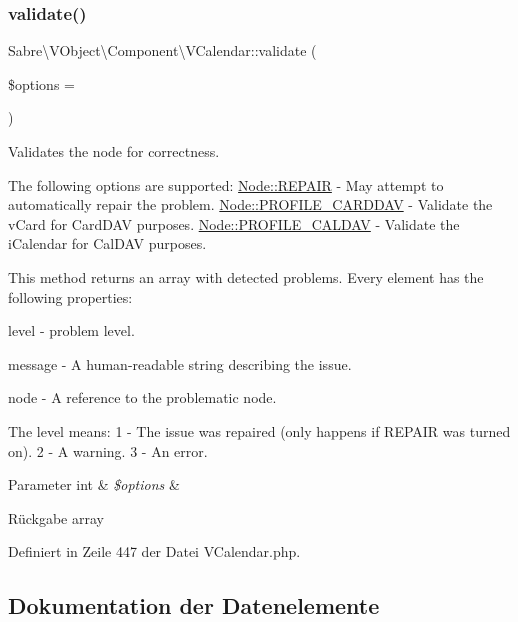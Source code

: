 \subsubsection{\texorpdfstring{validate()}{validate()}}
{\footnotesize\ttfamily Sabre\textbackslash{}\+V\+Object\textbackslash{}\+Component\textbackslash{}\+V\+Calendar\+::validate (\begin{DoxyParamCaption}\item[{}]{\$options = {} }\end{DoxyParamCaption})}

Validates the node for correctness.

The following options are supported\+: \mbox{\hyperlink{class_sabre_1_1_v_object_1_1_node_ac97a7fb85c1f871523336cd1ec6b29a9}{Node\+::\+R\+E\+P\+A\+IR}} -\/ May attempt to automatically repair the problem. \mbox{\hyperlink{class_sabre_1_1_v_object_1_1_node_a0aac3de0b04bcc44bbf0e22ae47a51c3}{Node\+::\+P\+R\+O\+F\+I\+L\+E\+\_\+\+C\+A\+R\+D\+D\+AV}} -\/ Validate the v\+Card for Card\+D\+AV purposes. \mbox{\hyperlink{class_sabre_1_1_v_object_1_1_node_a1e68f819b7b5537929290e061ffeacc5}{Node\+::\+P\+R\+O\+F\+I\+L\+E\+\_\+\+C\+A\+L\+D\+AV}} -\/ Validate the i\+Calendar for Cal\+D\+AV purposes.

This method returns an array with detected problems. Every element has the following properties\+:


\begin{DoxyItemize}
\item level -\/ problem level.
\item message -\/ A human-\/readable string describing the issue.
\item node -\/ A reference to the problematic node.
\end{DoxyItemize}

The level means\+: 1 -\/ The issue was repaired (only happens if R\+E\+P\+A\+IR was turned on). 2 -\/ A warning. 3 -\/ An error.


\begin{DoxyParams}[1]{Parameter}
int & {\em \$options} & \\
\hline
\end{DoxyParams}
\begin{DoxyReturn}{Rückgabe}
array 
\end{DoxyReturn}


Definiert in Zeile 447 der Datei V\+Calendar.\+php.



\subsection{Dokumentation der Datenelemente}
\mbox{\label{class_sabre_1_1_v_object_1_1_component_1_1_v_calendar_a70faae45a558b7da0014b730de7b0968}} 
